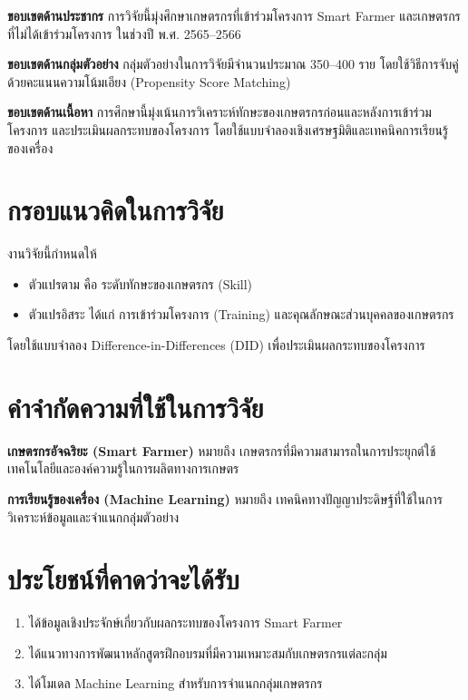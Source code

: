 \textbf{ขอบเขตด้านประชากร}  
การวิจัยนี้มุ่งศึกษาเกษตรกรที่เข้าร่วมโครงการ Smart Farmer และเกษตรกรที่ไม่ได้เข้าร่วมโครงการ ในช่วงปี พ.ศ. 2565–2566

\textbf{ขอบเขตด้านกลุ่มตัวอย่าง}  
กลุ่มตัวอย่างในการวิจัยมีจำนวนประมาณ 350–400 ราย โดยใช้วิธีการจับคู่ด้วยคะแนนความโน้มเอียง (Propensity Score Matching)

\textbf{ขอบเขตด้านเนื้อหา}  
การศึกษานี้มุ่งเน้นการวิเคราะห์ทักษะของเกษตรกรก่อนและหลังการเข้าร่วมโครงการ และประเมินผลกระทบของโครงการ โดยใช้แบบจำลองเชิงเศรษฐมิติและเทคนิคการเรียนรู้ของเครื่อง

\section{กรอบแนวคิดในการวิจัย}

งานวิจัยนี้กำหนดให้  
\begin{itemize}
\item ตัวแปรตาม คือ ระดับทักษะของเกษตรกร (Skill)
\item ตัวแปรอิสระ ได้แก่ การเข้าร่วมโครงการ (Training) และคุณลักษณะส่วนบุคคลของเกษตรกร
\end{itemize}

โดยใช้แบบจำลอง Difference-in-Differences (DID) เพื่อประเมินผลกระทบของโครงการ

\section{คำจำกัดความที่ใช้ในการวิจัย}

\textbf{เกษตรกรอัจฉริยะ (Smart Farmer)}  
หมายถึง เกษตรกรที่มีความสามารถในการประยุกต์ใช้เทคโนโลยีและองค์ความรู้ในการผลิตทางการเกษตร

\textbf{การเรียนรู้ของเครื่อง (Machine Learning)}  
หมายถึง เทคนิคทางปัญญาประดิษฐ์ที่ใช้ในการวิเคราะห์ข้อมูลและจำแนกกลุ่มตัวอย่าง

\section{ประโยชน์ที่คาดว่าจะได้รับ}

\begin{enumerate}
\item ได้ข้อมูลเชิงประจักษ์เกี่ยวกับผลกระทบของโครงการ Smart Farmer
\item ได้แนวทางการพัฒนาหลักสูตรฝึกอบรมที่มีความเหมาะสมกับเกษตรกรแต่ละกลุ่ม
\item ได้โมเดล Machine Learning สำหรับการจำแนกกลุ่มเกษตรกร
\end{enumerate}